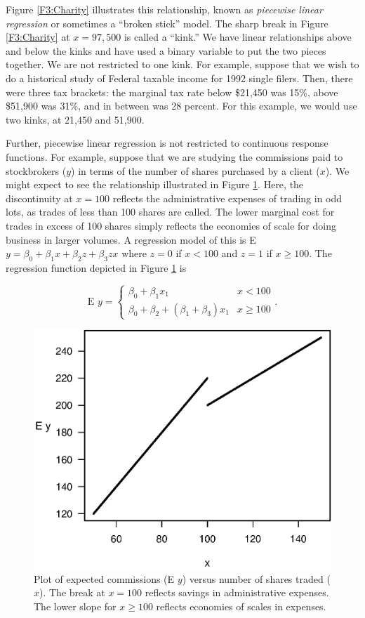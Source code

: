 Figure \ref{F3:Charity} illustrates this relationship, known as
\emph{piecewise linear regression} or sometimes a ``broken stick''
model. The sharp break in Figure \ref{F3:Charity} at $x = 97,500$ is
called a ``kink.'' We have linear relationships above and below the
kinks and have used a binary variable to put the two pieces
together. We are not restricted to one kink. For example, suppose
that we wish to do a historical study of Federal taxable income for
1992 single filers. Then, there were three tax brackets: the
marginal tax rate below \$21,450 was 15\%, above \$51,900 was 31\%,
and in between was 28 percent. For this example, we would use two
kinks, at 21,450 and 51,900.

Further, piecewise linear regression is not restricted to continuous
response functions. For example, suppose that we are studying the
commissions paid to stockbrokers ($y$) in terms of the number of
shares purchased by a client ($x$). We might expect to see the
relationship illustrated in Figure \ref{F3:Break}. Here, the
discontinuity at $x = 100$ reflects the administrative expenses of
trading in odd lots, as trades of less than 100 shares are called.
The lower marginal cost for trades in excess of 100 shares simply
reflects the economies of scale for doing business in larger
volumes. A regression model of this is E $y = \beta_0 + \beta_1 x +
\beta_2 z + \beta_3 z x$ where $z = 0$ if $x < 100$ and $z = 1$ if
$x \geq 100$. The regression function depicted in Figure
\ref{F3:Break} is

\begin{equation*}
\textrm{E }y = \left\{ \begin{array}{ll}
        \beta_0 + \beta_1  x_1                    & x<100 \\
        \beta_0 + \beta_2 + (\beta_1+\beta_3) x_1 & x \geq 100
\end{array} . \right.
\end{equation*}

\begin{figure}[htp]
  \begin{center}
    \includegraphics[width=.6\textwidth]{Chapter3/F3Break.eps}
    \caption{\label{F3:Break} \small Plot of expected commissions (E $y$) versus number of shares traded ($x$).
    The break at $x=100$ reflects savings in administrative expenses.
    The lower slope for $x \geq 100$ reflects economies of scales in expenses.}
  \end{center}
\end{figure}


